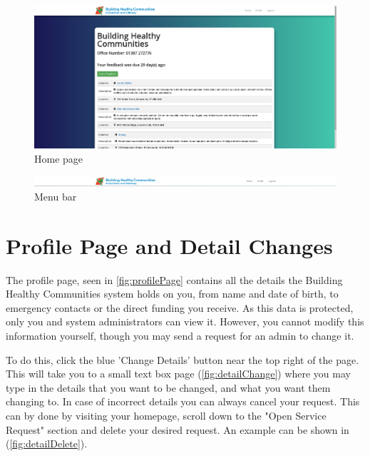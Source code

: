 \documentclass{bhcguides}
\begin{document}
\begin{figure}[h]
 \centerline{\includegraphics[width=\textwidth, height=\textheight, keepaspectratio]{homepage.png}}
 \caption{Home page}
 \label{fig:homePage}
\end{figure}

\begin{figure}[h]
 \centerline{\includegraphics[width=\textwidth, height=\textheight, keepaspectratio]{menubar.png}}
 \caption{Menu bar}
 \label{fig:menuBar}
\end{figure}

\pagebreak

\section{Profile Page and Detail Changes}
\label{sec:profile}

The profile page, seen in \autoref{fig:profilePage} contains all the details the Building Healthy Communities system holds on you, from name and date of birth, to emergency contacts or the direct funding you receive. As this data is protected, only you and system administrators can view it. However, you cannot modify this information yourself, though you may send a request for an admin to change it. 

To do this, click the blue 'Change Details' button near the top right of the page. This will take you to a small text box page (\autoref{fig:detailChange}) where you may type in the details that you want to be changed, and what you want them changing to. In case of incorrect details you can always cancel your request. This can by done by visiting your homepage, scroll down to the "Open Service Request" section and delete your desired request. An example can be shown in (\autoref{fig:detailDelete}).
\end{document}
